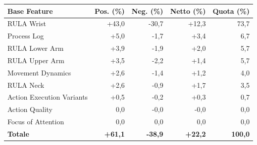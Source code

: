 \begin{tabular*}{\linewidth}{@{}l@{\extracolsep{\fill}}rrrr@{}}
\toprule
\textbf{Base Feature} & \textbf{Pos. (\%)} & \textbf{Neg. (\%)} & \textbf{Netto (\%)} & \textbf{Quota (\%)} \\
\midrule
RULA Wrist & +43{,}0 & -30{,}7 & +12{,}3 & 73{,}7 \\
Process Log & +5{,}0 & -1{,}7 & +3{,}4 & 6{,}7 \\
RULA Lower Arm & +3{,}9 & -1{,}9 & +2{,}0 & 5{,}7 \\
RULA Upper Arm & +3{,}5 & -2{,}2 & +1{,}4 & 5{,}7 \\
Movement Dynamics & +2{,}6 & -1{,}4 & +1{,}2 & 4{,}0 \\
RULA Neck & +2{,}6 & -0{,}9 & +1{,}7 & 3{,}5 \\
Action Execution Variants & +0{,}5 & -0{,}2 & +0{,}3 & 0{,}7 \\
Action Quality & 0{,}0 & -0{,}0 & -0{,}0 & 0{,}0 \\
Focus of Attention & 0{,}0 & 0{,}0 & 0{,}0 & 0{,}0 \\
\midrule
\textbf{Totale} & \textbf{+61{,}1} & \textbf{-38{,}9} & \textbf{+22{,}2} & \textbf{100{,}0} \\
\bottomrule
\end{tabular*}

